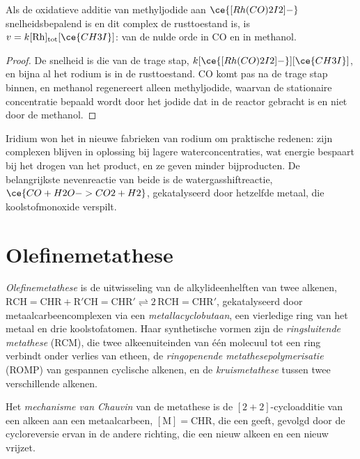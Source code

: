 \begin{proposition}\label{prop:b3:homogeneous-catalysis:monsanto-rate}
Als de oxidatieve additie van methyljodide aan $\ce{[Rh(CO)2I2]-}$ snelheidsbepalend is en
dit complex de rusttoestand is, is $v = k[\mathrm{Rh}]_{\mathrm{tot}}[\ce{CH3I}]$: van de nulde orde in CO en in
methanol.
\end{proposition}

\begin{proof}
De snelheid is die van de trage stap, $k[\ce{[Rh(CO)2I2]-}][\ce{CH3I}]$, en bijna al het rodium
is in de rusttoestand. CO komt pas na de trage stap binnen, en methanol
regenereert alleen methyljodide, waarvan de stationaire concentratie
bepaald wordt door het jodide dat in de reactor gebracht is en niet door
de methanol.
\end{proof}

Iridium won het in nieuwe fabrieken van rodium om praktische redenen:
zijn complexen blijven in oplossing bij lagere waterconcentraties, wat
energie bespaart bij het drogen van het product, en ze geven minder
bijproducten. De belangrijkste nevenreactie van beide is de
watergasshiftreactie, $\ce{CO + H2O -> CO2 + H2}$, gekatalyseerd door hetzelfde metaal, die
koolstofmonoxide verspilt.

\section{Olefinemetathese}

\begin{definition}[Olefinemetathese]\label{def:b3:homogeneous-catalysis:metathesis}
\emph{Olefinemetathese} is de uitwisseling van de
alkylideenhelften van twee alkenen, $\mathrm{RCH{=}CHR + R'CH{=}CHR' \rightleftharpoons 2\,RCH{=}CHR'}$, gekatalyseerd door
metaalcarbeencomplexen via een
\emph{metallacyclobutaan},
een vierledige ring van het metaal en drie koolstofatomen. Haar
synthetische vormen zijn de
\emph{ringsluitende metathese} (RCM), die
twee alkeenuiteinden van één molecuul tot een ring verbindt onder verlies
van etheen, de
\emph{ringopenende metathesepolymerisatie}
(ROMP) van gespannen cyclische alkenen, en de
\emph{kruismetathese} tussen twee verschillende
alkenen.
\end{definition}

\begin{definition}\label{def:b3:homogeneous-catalysis:chauvin}
Het \emph{mechanisme van Chauvin} van de
metathese is de
$[2+2]$-cycloadditie van een alkeen aan een metaalcarbeen, $\mathrm{[M]{=}CHR}$, die een
 geeft, gevolgd door de cycloreversie ervan in de andere
richting, die een nieuw alkeen en een nieuw  vrijzet.
\end{definition}

